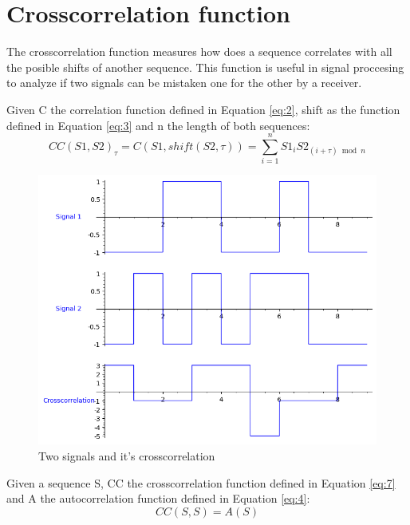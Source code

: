 \section{Crosscorrelation function}

The crosscorrelation function measures how does a sequence correlates with all
the posible shifts of another sequence. This function is useful in signal
proccesing to analyze if two signals can be mistaken one for the other by a
receiver.


\begin{definition}[Crosscorrelation]\label{def:4}
  Given C the correlation function defined in Equation \ref{eq:2}, shift as the function defined in Equation \ref{eq:3} and n the length of both sequences:
  \begin{equation}\label{eq:7}
    CC(S1, S2)_{\tau} = C(S1, shift(S2, \tau)) = \sum_{i=1}^{n}S1_{i}S2_{(i+\tau) \bmod n}
  \end{equation}
\end{definition}

\begin{figure}[ht!] %
\begin{center}
\includegraphics[width=0.7\linewidth]{Chapters/Introduction/signals_crosscorrelation}
\end{center}
\caption{Two signals and it's crosscorrelation}
\label{introduction_signals_crosscorrelation}
\end{figure}

\begin{lemma}\label{lem:1}
  Given a sequence S, CC the crosscorrelation function defined in Equation
  \ref{eq:7} and A the autocorrelation function defined in Equation \ref{eq:4}:
  \begin{equation}\label{eq:8}
    CC(S, S) = A(S)
  \end{equation}
\end{lemma}












